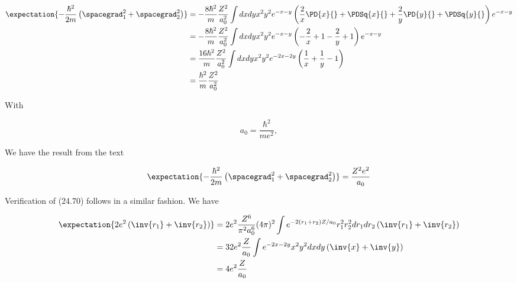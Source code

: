 \begin{align*}
\expectation{
-\frac{\hbar^2}{2m}
\left( \spacegrad_1^2 + \spacegrad_2^2\right) 
}
&=
-\frac{8 \hbar^2}{m}
\frac{ Z^2}{ a_0^2 } 
\int 
dx dy
x^2 y^2
e^{-x - y}
\left(
\frac{2}{x} \PD{x}{}
+ \PDSq{x}{}
+\frac{2}{y} \PD{y}{}
+ \PDSq{y}{}
\right)
e^{-x - y}
 \\
&=
-\frac{8 \hbar^2}{m}
\frac{ Z^2}{ a_0^2 } 
\int 
dx dy
x^2 y^2
e^{-x - y}
\left(
-\frac{2}{x} 
+ 1
-\frac{2}{y} 
+ 
1
\right)
e^{-x - y}
 \\
&=
\frac{16 \hbar^2}{m}
\frac{ Z^2}{ a_0^2 } 
\int 
dx dy
x^2 y^2
e^{-2 x - 2 y}
\left(
\frac{1}{x} 
+\frac{1}{y} 
- 1
\right)
 \\
&=
\frac{\hbar^2}{m}
\frac{ Z^2}{ a_0^2 } 
\end{align*}

With 

\begin{equation}\label{eqn:desaiCh24:n}
a_0 = \frac{\hbar^2}{m e^2},
\end{equation}

We have the result from the text

\begin{equation}\label{eqn:desaiCh24:n}
\expectation{
-\frac{\hbar^2}{2m}
\left( \spacegrad_1^2 + \spacegrad_2^2\right) 
}
=
\frac{ Z^2 e^2}{ a_0 } 
\end{equation}

Verification of (24.70) follows in a similar fashion.  We have

\begin{align*}
\expectation{ 2 e^2 
\left( \inv{r_1} + \inv{r_2} \right) 
}
&=
2 e^2 \frac{Z^6}{ \pi^2 a_0^6} (4 \pi)^2 \int e^{-2 (r_1 + r_2) Z/a_0 } r_1^2 r_2^2 dr_1 dr_2 
\left( \inv{r_1} + \inv{r_2} \right) 
\\
&=
32 e^2 \frac{Z}{ a_0} \int e^{-2 x - 2 y} x^2 y^2 dx dy 
\left( \inv{x} + \inv{y} \right) 
\\
&=
4 e^2 \frac{Z}{ a_0} 
\end{align*}

\EndArticle
